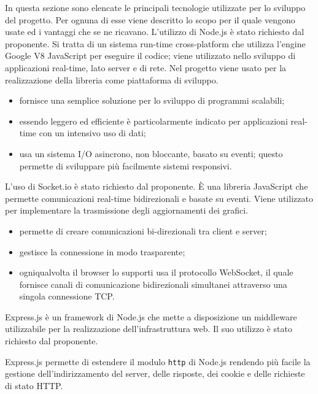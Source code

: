 In questa sezione sono elencate le principali tecnologie utilizzate per lo sviluppo del progetto. Per ognuna di esse viene descritto lo scopo per il quale vengono usate ed i vantaggi che se ne ricavano.
L'utilizzo di Node.js è stato richiesto dal proponente. Si tratta di un sistema run-time cross-platform che utilizza l'engine Google V8 JavaScript per eseguire il codice; viene utilizzato nello sviluppo di applicazioni real-time, lato server e di rete. Nel progetto viene usato per la realizzazione della libreria come piattaforma di sviluppo.
\begin{itemize}
\item fornisce una semplice soluzione per lo sviluppo di programmi scalabili;
\item essendo leggero ed efficiente è particolarmente indicato per applicazioni real-time con un intensivo uso di dati;
\item usa un sistema I/O asincrono, non bloccante, basato su eventi; questo permette di sviluppare più facilmente sistemi responsivi.
\end{itemize}

L'uso di Socket.io è stato richiesto dal proponente. È una libreria JavaScript che permette comunicazioni real-time bidirezionali e basate su eventi. Viene utilizzato per implementare la trasmissione degli aggiornamenti dei grafici.
\begin{itemize}
\item permette di creare comunicazioni bi-direzionali tra client e server;
\item gestisce la connessione in modo trasparente;
\item ogniqualvolta il browser lo supporti usa il protocollo WebSocket, il quale fornisce canali di comunicazione bidirezionali simultanei attraverso una singola connessione TCP.
\end{itemize}

Express.js è un framework di Node.js che mette a disposizione un middleware utilizzabile per la realizzazione dell'infrastruttura web. Il suo utilizzo è stato richiesto dal proponente.

Express.js permette di estendere il modulo \texttt{http} di Node.js rendendo più facile la gestione dell'indirizzamento del server, delle risposte, dei cookie e delle richieste di stato HTTP.

